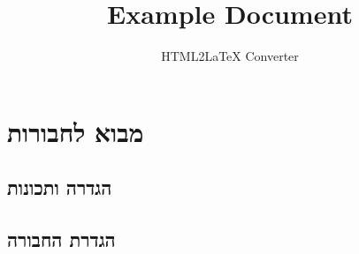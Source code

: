\documentclass{tstextbook}
\begin{document}
\title{Example Document}
\author{HTML2LaTeX Converter}
\maketitle

\chapter{מבוא לחבורות}

\section{הגדרה ותכונות}

\section{הגדרת החבורה}
\end{document}
